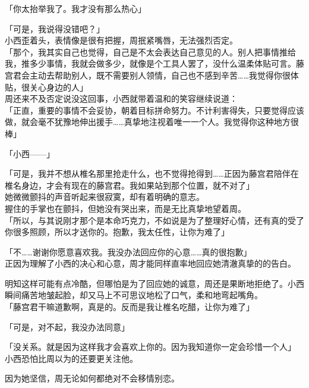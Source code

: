 「你太抬举我了。我才没有那么热心」

「可是，我说得没错吧？」\\

小西歪着头，表情像是很有把握，周抿紧嘴唇，无法强烈否定。\\

「那个，我其实自己也觉得，自己是不太会表达自己意见的人。别人把事情推给我，推多少事情，我就会做多少，就像是个工具人罢了，没什么温柔体贴可言。藤宫君会主动去帮助别人，既不需要别人领情，自己也不感到辛苦……我觉得你很体贴，很关心身边的人」\\

周还来不及否定说没这回事，小西就带着温和的笑容继续说道：\\

「正直，重要的事情不会妥协，朝着目标拼命努力。不计利害得失，只要觉得应该做，就会毫不犹豫地伸出援手……真挚地注视着唯一一个人。我觉得你这种地方很棒」

「小西——」

「可是，我并不想从椎名那里抢走什么，也不觉得抢得到……正因为藤宫君陪伴在椎名身边，才会有现在的藤宫君。我如果站到那个位置，就不对了」\\

她微微颤抖的声音听起来很寂寞，却有着明确的意志。\\

握住的手掌也在颤抖，但她没有哭出来，而是无比真挚地望着周。\\

「所以，与其说刚才那个是本命巧克力，不如说是为了整理好心情，还有真的受了你很多照顾，所以才送你的。抱歉，我太任性，让你为难了」

「不……谢谢你愿意喜欢我。我没办法回应你的心意……真的很抱歉」\\

正因为理解了小西的决心和心意，周才能同样直率地回应她清澈真挚的的告白。

明知这样可能有点冷酷，但哪怕是为了回应她的诚意，周还是果断地拒绝了。小西瞬间痛苦地皱起脸，却又马上不可思议地松了口气，柔和地弯起嘴角。\\

「藤宫君干嘛道歉啊，真是的。反而是我让椎名吃醋，让你为难了」

「可是，对不起，我没办法同意」

「没关系。就是因为这样我才会喜欢上你的。因为我知道你一定会珍惜一个人」\\

小西恐怕比周以为的还要更关注他。

因为她坚信，周无论如何都绝对不会移情别恋。\\

